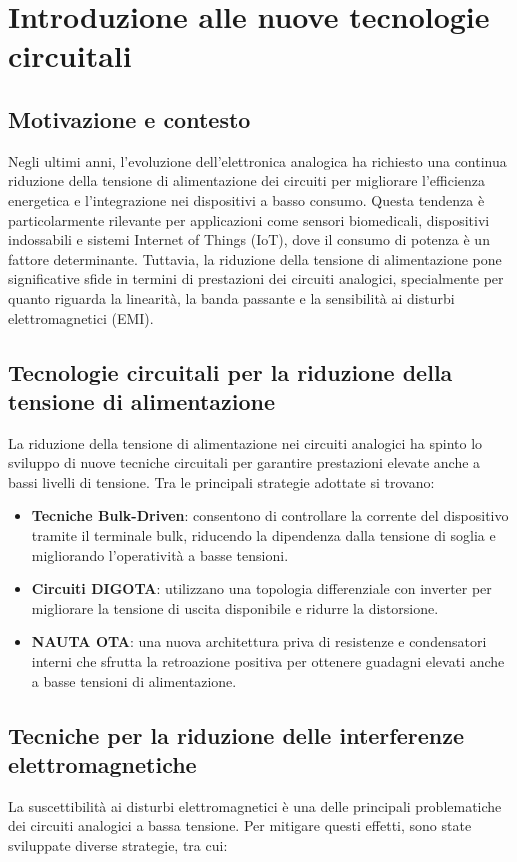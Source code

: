 \documentclass[oneside, a4paper]{book}
\begin{document}
\chapter{Introduzione alle nuove tecnologie circuitali}

\section{Motivazione e contesto}
Negli ultimi anni, l'evoluzione dell'elettronica analogica ha richiesto una continua riduzione della tensione di alimentazione dei circuiti per migliorare l'efficienza energetica e l'integrazione nei dispositivi a basso consumo. Questa tendenza è particolarmente rilevante per applicazioni come sensori biomedicali, dispositivi indossabili e sistemi Internet of Things (IoT), dove il consumo di potenza è un fattore determinante. Tuttavia, la riduzione della tensione di alimentazione pone significative sfide in termini di prestazioni dei circuiti analogici, specialmente per quanto riguarda la linearità, la banda passante e la sensibilità ai disturbi elettromagnetici (EMI).

\section{Tecnologie circuitali per la riduzione della tensione di alimentazione}
La riduzione della tensione di alimentazione nei circuiti analogici ha spinto lo sviluppo di nuove tecniche circuitali per garantire prestazioni elevate anche a bassi livelli di tensione. Tra le principali strategie adottate si trovano:

\begin{itemize}
    \item \textbf{Tecniche Bulk-Driven}: consentono di controllare la corrente del dispositivo tramite il terminale bulk, riducendo la dipendenza dalla tensione di soglia e migliorando l'operatività a basse tensioni.
    \item \textbf{Circuiti DIGOTA}: utilizzano una topologia differenziale con inverter per migliorare la tensione di uscita disponibile e ridurre la distorsione.
    \item \textbf{NAUTA OTA}: una nuova architettura priva di resistenze e condensatori interni che sfrutta la retroazione positiva per ottenere guadagni elevati anche a basse tensioni di alimentazione.
\end{itemize}

\section{Tecniche per la riduzione delle interferenze elettromagnetiche}
La suscettibilità ai disturbi elettromagnetici è una delle principali problematiche dei circuiti analogici a bassa tensione. Per mitigare questi effetti, sono state sviluppate diverse strategie, tra cui:
\end{document}
